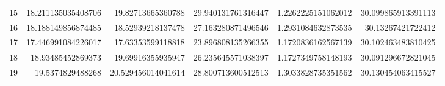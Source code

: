 \begin{tabular}{lrrrrr}
15 & 18.211135035408706 & 19.82713665360788 & 29.940131761316447 & 1.2262225151062012 & 30.099865913391113 \\
16 & 18.188149856874485 & 18.52939218137478 & 27.163280871496546 & 1.2931084632873535 & 30.13267421722412 \\
17 & 17.446991084226017 & 17.63353599118818 & 23.896808135266355 & 1.1720836162567139 & 30.102463483810425 \\
18 & 18.93485452869373 & 19.69916355935947 & 26.235645571038397 & 1.1727349758148193 & 30.091296672821045 \\
19 & 19.5374829488268 & 20.529456014041614 & 28.800713600512513 & 1.3033828735351562 & 30.130454063415527 \\
\hline
\end{tabular}
